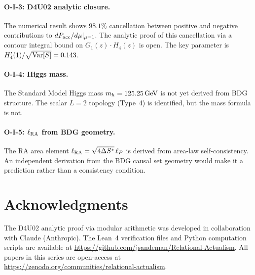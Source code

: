 \documentclass[12pt,a4paper]{article}
\begin{document}
\paragraph{O-I-3: D4U02 analytic closure.}  The numerical result shows $98.1\%$ cancellation between positive and negative contributions to $dP_{\rm acc}/d\mu|_{\mu=1}$.  The analytic proof of this cancellation via a contour integral bound on $G_1(z)\cdot H_4(z)$ is open.  The key parameter is $H_4'(1)/\sqrt{{\rm Var}[S]}=0.143$.

\paragraph{O-I-4: Higgs mass.}  The Standard Model Higgs mass $m_h=125.25\,{\rm GeV}$ is not yet derived from BDG structure.  The scalar $L=2$ topology (Type~4) is identified, but the mass formula is not.

\paragraph{O-I-5: $\ell_{\rm RA}$ from BDG geometry.}  The RA area element $\ell_{\rm RA}=\sqrt{4\Delta S^*}\,\ell_P$ is derived from area-law self-consistency.  An independent derivation from the BDG causal set geometry would make it a prediction rather than a consistency condition.

\section*{Acknowledgments}

The D4U02 analytic proof via modular arithmetic was developed in collaboration with Claude (Anthropic).  The Lean~4 verification files and Python computation scripts are available at \url{https://github.com/jsandeman/Relational-Actualism}.  All papers in this series are open-access at \url{https://zenodo.org/communities/relational-actualism}.
\end{document}
